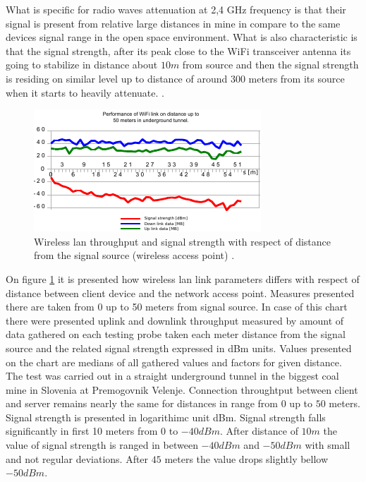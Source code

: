 \documentclass[../main.tex]{subfiles}
\begin{document}
What is specific for radio waves attenuation at 2,4 GHz frequency is that their signal is present from relative large distances in mine in compare to the same devices signal range in the open space environment. What is also characteristic is that the signal strength, after its peak close to the WiFi transceiver antenna its going to stabilize in distance about $10m$ from source and then the signal strength is residing on similar level up to distance of around $300$ meters from its source when it starts to heavily attenuate. \cite{Thesis_CM}.

\begin{figure}[!htbp]
\includegraphics[width=\textwidth]{pictures/wifi_link_short.pdf}
\centering
\caption{Wireless lan throughput and signal strength with respect of distance from the signal source (wireless access point) \cite{Thesis_CM}. }
\label{fig:wifi_link_short}
\end{figure}


On figure \ref{fig:wifi_link_short} it is presented how wireless lan link parameters differs with respect of distance between client device and the network access point. Measures presented there are taken from 0 up to 50 meters from signal source. In case of this chart there were presented uplink and downlink throughput measured by amount of data gathered on each testing probe taken each meter distance from the signal source and the related signal strength expressed in dBm units. Values presented on the chart are medians of all gathered values and factors for given distance. The test was carried out in a straight underground tunnel in the biggest coal mine in Slovenia at Premogovnik Velenje. Connection throughtput between client and server remains nearly the same for distances in range from $0$ up to $50$ meters. Signal strength is presented in logarithimc unit dBm. Signal strength falls significantly in first 10 meters from $0$ to $-40 dBm$. After distance of $10m$ the value of signal strength is ranged in between $-40 dBm$ and $-50 dBm$ with small and not regular deviations. After $45$ meters the value drops slightly bellow $-50 dBm$.
\end{document}
